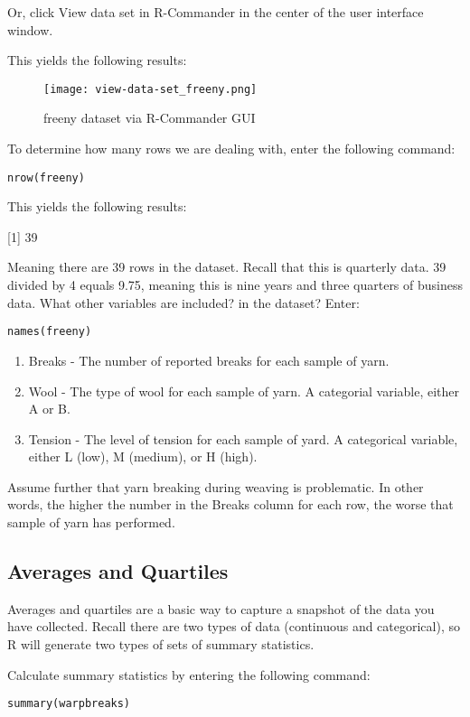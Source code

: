 Or, click View data set in R-Commander in the center of the user interface window.

This yields the following results:

\begin{figure}[h!]
\texttt{[image: view-data-set\_freeny.png]}
 \caption{freeny dataset via R-Commander GUI}
 \label{fig:view-data-set_freeny}
\end{figure}

To determine how many rows we are dealing with, enter the following command:

\texttt{nrow(freeny)}

This yields the following results:

[1] 39

Meaning there are 39 rows in the dataset. Recall that this is quarterly data. 
39 divided by 4 equals 9.75, meaning this is nine years and three quarters of 
business data. What other variables are included? in the dataset? Enter: 

\texttt{names(freeny)}

\begin{enumerate}
 \item Breaks - The number of reported breaks for each sample of yarn.
 \item Wool - The type of wool for each sample of yarn. A categorial variable, either A or B.
 \item Tension - The level of tension for each sample of yard. A categorical variable, either L (low), M (medium), or H (high).
\end{enumerate}

Assume further that yarn breaking during weaving is problematic. In other words, the higher the number in the Breaks column for each row, the worse that sample of yarn has performed. 

\subsection{Averages and Quartiles}
Averages and quartiles are a basic way to capture a snapshot of the data you have collected. Recall there are two types of data (continuous and categorical), so R will generate two types of sets of summary statistics.

Calculate summary statistics by entering the following command:

\texttt{summary(warpbreaks)}

